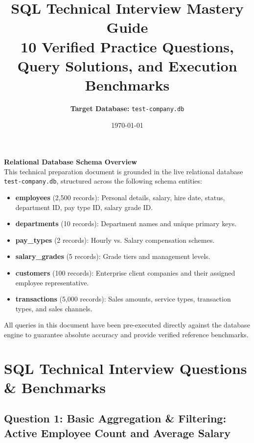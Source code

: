 \documentclass[11pt,a4paper]{article}
\title{\Huge \textbf{SQL Technical Interview Mastery Guide}\\\Large 10 Verified Practice Questions, Query Solutions, and Execution Benchmarks}
\author{\textbf{Target Database:} \texttt{test-company.db}}
\date{\today}
\begin{document}
\maketitle

\begin{center}
\colorbox{gray!15}{
\parbox{0.95\textwidth}{
\vspace{0.2cm}
\textbf{\large Relational Database Schema Overview} \\
This technical preparation document is grounded in the live relational database \texttt{test-company.db}, structured across the following schema entities:
\begin{itemize}
    \item \textbf{employees} (2,500 records): Personal details, salary, hire date, status, department ID, pay type ID, salary grade ID.
    \item \textbf{departments} (10 records): Department names and unique primary keys.
    \item \textbf{pay\_types} (2 records): Hourly vs. Salary compensation schemes.
    \item \textbf{salary\_grades} (5 records): Grade tiers and management levels.
    \item \textbf{customers} (100 records): Enterprise client companies and their assigned employee representative.
    \item \textbf{transactions} (5,000 records): Sales amounts, service types, transaction types, and sales channels.
\end{itemize}
All queries in this document have been pre-executed directly against the database engine to guarantee absolute accuracy and provide verified reference benchmarks.
\vspace{0.2cm}
}
}
\end{center}

\vspace{0.3cm}
\tableofcontents
\newpage

\section{SQL Technical Interview Questions \& Benchmarks}

\subsection*{Question 1: Basic Aggregation & Filtering: Active Employee Count and Average Salary}
\end{document}
